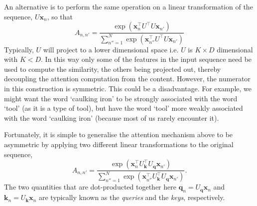 \documentclass{article}
\begin{document}
An alternative is to perform the same operation on a linear transformation of the sequence, $U \bm{x}_n$, so that
%
\[ A_{n,n'} = \frac{\exp( \bm{x}_n^\top U^\top U \bm{x}_{n'})}{\sum_{n''=1}^N \exp(\bm{x}_{n''}^\top U^\top U \bm{x}_{n'})} \]
%
Typically, $U$ will project to a lower dimensional space i.e. $U$ is $K \times D$ dimensional with $K<D$. In this way only some of the features in the input sequence need be used to compute the similarity, the others being projected out, thereby decoupling the attention computation from the content. However, the numerator in this construction is symmetric. 
%
This could be a disadvantage. For example, we might want the word `caulking iron' to be strongly associated with the word `tool' (as it is a type of tool), but have the word `tool' more weakly associated with the word `caulking iron' (because most of us rarely encounter it).

Fortunately, it is simple to generalise the attention mechanism above to be asymmetric by applying two different linear transformations to the original sequence,
%
\begin{equation} 
A_{n,n'} = \frac{\exp \left( \bm{x}_n^\top U_{\bm{k}}^\top U_{\bm{q}}^{} \bm{x}_{n'} \right)}{\sum_{n''=1}^N \exp \left(\bm{x}_{n''}^\top U_{\bm{k}}^\top U_{\bm{q}}^{} \bm{x}_{n'}\right)}. \label{eq:SA2}
\end{equation}
%
The two quantities that are dot-producted together here $\bm{q}_n = U_{\bm{q}}\bm{x}_{n}$ and $\bm{k}_n = U_{\bm{k}} \bm{x}_{n}$ are typically known as the \emph{queries} and the \emph{keys}, respectively.
\end{document}
